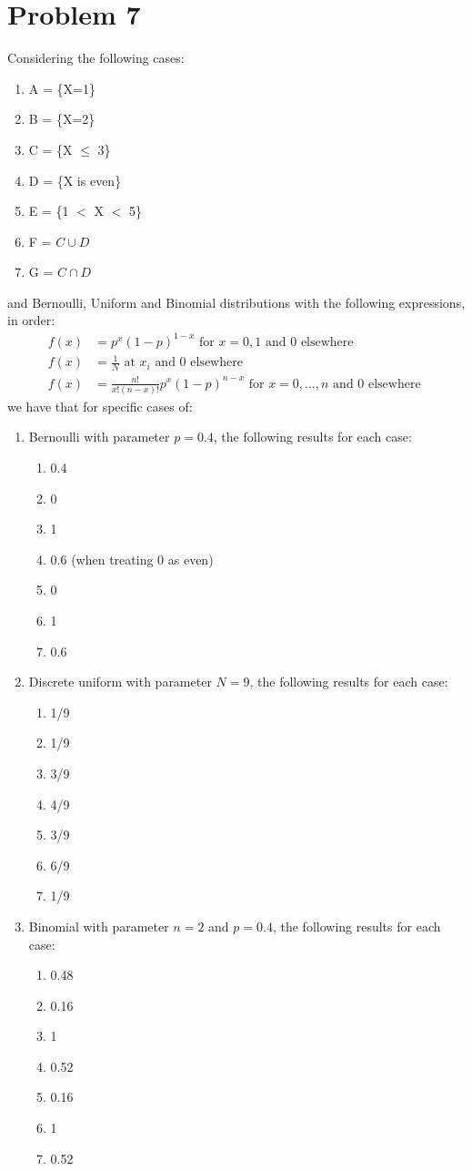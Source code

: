 \documentclass{article}
\newcommand{\1}{\mathbf{1}}
\begin{document}
\section*{Problem 7}
Considering the following cases:
\begin{enumerate}
	\item A = \{X=1\}
	\item B = \{X=2\}
	\item C = \{X $\leq$ 3\}
	\item D = \{X is even\}
	\item E = \{1 $<$ X $<$ 5\}
	\item F = $C\cup D$
	\item G = $C\cap D$
\end{enumerate}
and Bernoulli, Uniform and Binomial distributions with the following expressions, in order:
\begin{align*}
f(x) &= p^x(1-p)^{1-x} \text{ for } x={0,1} \text{ and } 0 \text{ elsewhere } \\
f(x) &= \frac{1}{N} \text{ at } x_i \text{ and } 0 \text{ elsewhere } \\
f(x) &= \frac{n!}{x!(n-x)!}p^x(1-p)^{n-x} \text{ for } x={0,\dots,n} \text{ and } 0 \text{ elsewhere }
\end{align*}
we have that for specific cases of:
\begin{enumerate}
	\item Bernoulli with parameter $p=0.4$, the following results for each case:
	\begin{enumerate}
    	\item 0.4
    	\item 0
    	\item 1
    	\item 0.6 (when treating 0 as even)
    	\item 0
    	\item 1
    	\item 0.6
    \end{enumerate}
    \item Discrete uniform with parameter $N=9$, the following results for each case:
	\begin{enumerate}
    	\item 1/9
    	\item 1/9
    	\item 3/9
    	\item 4/9
    	\item 3/9
    	\item 6/9
    	\item 1/9
    \end{enumerate}
    \item Binomial with parameter $n=2$ and $p=0.4$, the following results for each case:
	\begin{enumerate}
    	\item 0.48
    	\item 0.16
    	\item 1
    	\item 0.52
    	\item 0.16
    	\item 1
    	\item 0.52
    \end{enumerate}
\end{enumerate}
\end{document}
